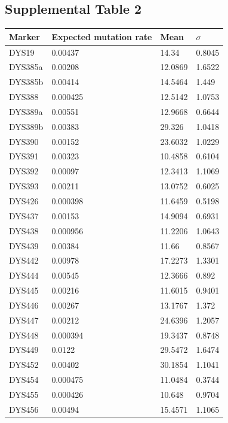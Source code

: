 \subsection{Supplemental Table 2}
\begin{table}[h!]
\centering
\label{tab:sursuptab2}
\begin{adjustbox}{height=0.4\textheight}
\begin{tabular}{l l l l}
\hline
Marker & Expected mutation rate & Mean & $\sigma$ \\
\hline
DYS19     & 0.00437  & 14.34   & 0.8045 \\
DYS385a   & 0.00208  & 12.0869 & 1.6522 \\
DYS385b   & 0.00414  & 14.5464 & 1.449  \\
DYS388    & 0.000425 & 12.5142 & 1.0753 \\
DYS389a   & 0.00551  & 12.9668 & 0.6644 \\
DYS389b   & 0.00383  & 29.326  & 1.0418 \\
DYS390    & 0.00152  & 23.6032 & 1.0229 \\
DYS391    & 0.00323  & 10.4858 & 0.6104 \\
DYS392    & 0.00097  & 12.3413 & 1.1069 \\
DYS393    & 0.00211  & 13.0752 & 0.6025 \\
DYS426    & 0.000398 & 11.6459 & 0.5198 \\
DYS437    & 0.00153  & 14.9094 & 0.6931 \\
DYS438    & 0.000956 & 11.2206 & 1.0643 \\
DYS439    & 0.00384  & 11.66   & 0.8567 \\
DYS442    & 0.00978  & 17.2273 & 1.3301 \\
DYS444    & 0.00545  & 12.3666 & 0.892  \\
DYS445    & 0.00216  & 11.6015 & 0.9401 \\
DYS446    & 0.00267  & 13.1767 & 1.372  \\
DYS447    & 0.00212  & 24.6396 & 1.2057 \\
DYS448    & 0.000394 & 19.3437 & 0.8748 \\
DYS449    & 0.0122   & 29.5472 & 1.6474 \\
DYS452    & 0.00402  & 30.1854 & 1.1041 \\
DYS454    & 0.000475 & 11.0484 & 0.3744 \\
DYS455    & 0.000426 & 10.648  & 0.9704 \\
DYS456    & 0.00494  & 15.4571 & 1.1065 \\

\end{tabular}
\end{adjustbox}
\end{table}
